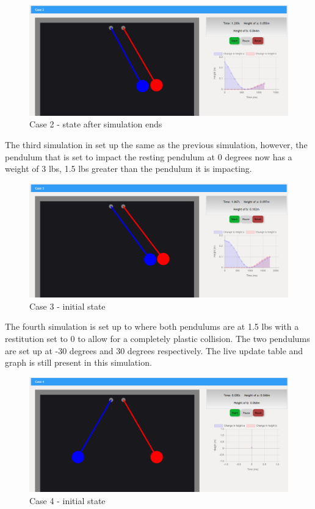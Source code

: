 \documentclass[onecolumn, draftclsnofoot,10pt, compsoc]{IEEEtran}
\begin{document}
\begin{figure}[H]
  \includegraphics[width=5.5 in]{pictures_beta/case2_end.png}
  \caption{Case 2 - state after simulation ends }
  \label{fig:case2_end}
\end{figure}

\noindent 
The third simulation in set up the same as the previous simulation, however, the pendulum that is set to impact the resting pendulum at 0 degrees now has a weight of 3 lbs, 1.5 lbs greater than the pendulum it is impacting. 

\begin{figure}[H]
  \includegraphics[width=5.5 in]{pictures_beta/case3_end.png}
  \caption{Case 3 - initial state }
  \label{fig:case3}
\end{figure}

\noindent 
The fourth simulation is set up to where both pendulums are at 1.5 lbs with a restitution set to 0 to allow for a completely plastic collision. The two pendulums are set up at -30 degrees and 30 degrees respectively. The live update table and graph is still present in this simulation. 

\begin{figure}[H]
  \includegraphics[width=5.5 in]{pictures_beta/case4_start.png}
  \caption{Case 4 - initial state }
  \label{fig:case4}
\end{figure}
\end{document}
